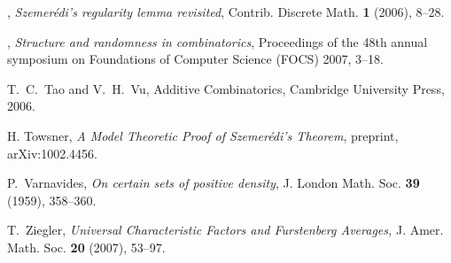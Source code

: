 \documentclass[11pt,reqno]{amsart}
\numberwithin{equation}{section}
\theoremstyle{plain}
\theoremstyle{definition}
\newcommand\1{{\bf 1}}
\newcommand\2{{\bf 2}}
\begin{document}
\begin{thebibliography}{99}
\bysame, \emph{Szemer\'edi's regularity lemma revisited}, Contrib. Discrete Math. \textbf{1} (2006), 8--28.

\bysame, \emph{Structure and randomness in combinatorics}, Proceedings of the 48th annual symposium on Foundations of Computer Science (FOCS) 2007, 3--18.

T.~C.~Tao and V.~H.~Vu, Additive Combinatorics, Cambridge University Press, 2006.

H. Towsner, \emph{A Model Theoretic Proof of Szemer\'edi's Theorem}, preprint, arXiv:1002.4456.

P.~Varnavides, \emph{On certain sets of positive density}, {J. London Math. Soc.}  \textbf{39} (1959), 358--360.

 T.~Ziegler, \emph{Universal Characteristic Factors and Furstenberg Averages,} J. Amer. Math. Soc. \textbf{20} (2007), 53--97.


\end{thebibliography}
\end{document}
